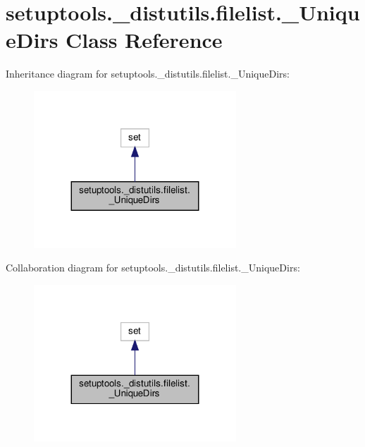 \hypertarget{classsetuptools_1_1__distutils_1_1filelist_1_1__UniqueDirs}{}\section{setuptools.\+\_\+distutils.\+filelist.\+\_\+\+Unique\+Dirs Class Reference}
\label{classsetuptools_1_1__distutils_1_1filelist_1_1__UniqueDirs}


Inheritance diagram for setuptools.\+\_\+distutils.\+filelist.\+\_\+\+Unique\+Dirs\+:
\nopagebreak
\begin{figure}[H]
\begin{center}
\leavevmode
\includegraphics[width=215pt]{classsetuptools_1_1__distutils_1_1filelist_1_1__UniqueDirs__inherit__graph}
\end{center}
\end{figure}


Collaboration diagram for setuptools.\+\_\+distutils.\+filelist.\+\_\+\+Unique\+Dirs\+:
\nopagebreak
\begin{figure}[H]
\begin{center}
\leavevmode
\includegraphics[width=215pt]{classsetuptools_1_1__distutils_1_1filelist_1_1__UniqueDirs__coll__graph}
\end{center}
\end{figure}
